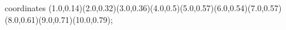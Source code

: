 					coordinates { (1.0,0.14)(2.0,0.32)(3.0,0.36)(4.0,0.5)(5.0,0.57)(6.0,0.54)(7.0,0.57)(8.0,0.61)(9.0,0.71)(10.0,0.79)};
